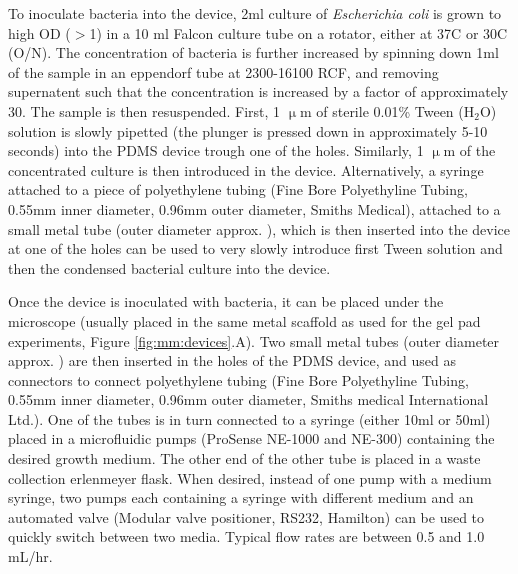 To inoculate bacteria into the device, 2ml culture of \textit{Escherichia coli} is grown to high OD ($>$1) in a 10 ml Falcon culture tube on a rotator, either at 37C or 30C (O/N). 
The concentration of bacteria is further increased by spinning down 1ml of the sample in an eppendorf tube at 2300-16100 RCF, and removing supernatent such that the concentration is increased by a factor of approximately 30. The sample is then resuspended.
%
First, 1 $\upmu$m of sterile 0.01\% Tween ($\text{H}_2\text{O}$) solution is slowly pipetted (the plunger is pressed down in approximately 5-10 seconds) into the PDMS device trough one of the holes.
Similarly, 1 $\upmu$m of the concentrated culture is then introduced in the device.
%
Alternatively, a syringe attached to a piece of polyethylene tubing (Fine Bore Polyethyline Tubing, 0.55mm inner diameter, 0.96mm outer diameter, Smiths Medical), attached to a small metal tube (outer diameter approx. \red{0.65mm}), which is then inserted into the device at one of the holes can be used to very slowly introduce first Tween solution and then the condensed bacterial culture into the device.


Once the device is inoculated with bacteria, it can be placed under the microscope (usually placed in the same metal scaffold as used for the gel pad experiments, Figure \ref{fig:mm:devices}.A). 
Two small metal tubes (outer diameter approx. \red{0.65mm}) are then inserted in the holes of the PDMS device, and used as connectors to connect polyethylene tubing (Fine Bore Polyethyline Tubing, 0.55mm inner diameter, 0.96mm outer diameter, Smiths medical International Ltd.).
One of the tubes is in turn connected to a syringe (either 10ml or 50ml) placed in a microfluidic pumps (ProSense NE-1000 and NE-300) containing the desired growth medium.
The other end of the other tube is placed in a waste collection erlenmeyer flask.
When desired, instead of one pump with a medium syringe, two pumps each containing a syringe with different medium and an automated valve (Modular valve positioner, RS232, Hamilton) can be used to quickly switch between two media.
Typical flow rates are between 0.5 and 1.0 mL/hr.

%
%

